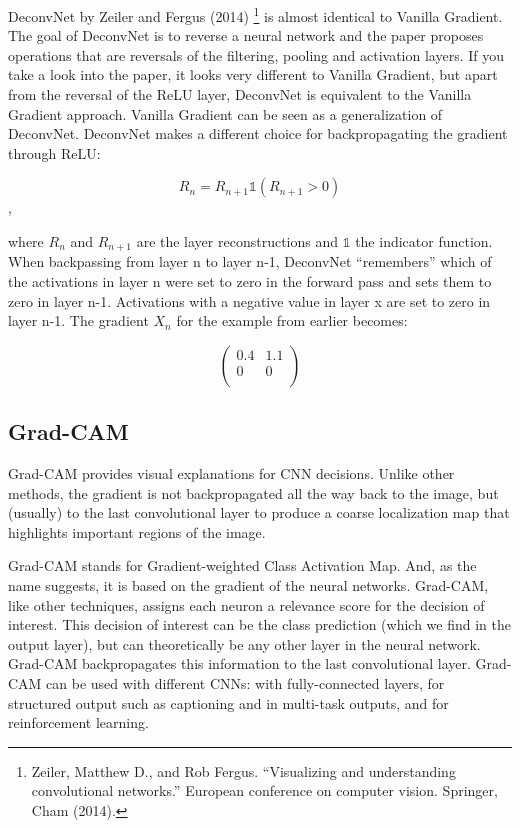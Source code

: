 \documentclass[
  10pt,
]{scrbook}
\begin{document}
DeconvNet by Zeiler and Fergus (2014) \footnote{Zeiler, Matthew D., and Rob Fergus. ``Visualizing and understanding convolutional networks.'' European conference on computer vision. Springer, Cham (2014).} is almost identical to Vanilla Gradient.
The goal of DeconvNet is to reverse a neural network and the paper proposes operations that are reversals of the filtering, pooling and activation layers.
If you take a look into the paper, it looks very different to Vanilla Gradient, but apart from the reversal of the ReLU layer, DeconvNet is equivalent to the Vanilla Gradient approach.
Vanilla Gradient can be seen as a generalization of DeconvNet.
DeconvNet makes a different choice for backpropagating the gradient through ReLU:

\[R_n=R_{n+1}\mathbb{1}(R_{n+1}>0)\],

where \(R_n\) and \(R_{n+1}\) are the layer reconstructions and \(\mathbb{1}\) the indicator function.
When backpassing from layer n to layer n-1, DeconvNet ``remembers'' which of the activations in layer n were set to zero in the forward pass and sets them to zero in layer n-1.
Activations with a negative value in layer x are set to zero in layer n-1.
The gradient \(X_n\) for the example from earlier becomes:

\[
\begin{pmatrix}
0.4 & 1.1 \\
0 & 0  \\
\end{pmatrix}
\]

\hypertarget{grad-cam}{%
\subsection{Grad-CAM}\label{grad-cam}}

Grad-CAM provides visual explanations for CNN decisions.
Unlike other methods, the gradient is not backpropagated all the way back to the image, but (usually) to the last convolutional layer to produce a coarse localization map that highlights important regions of the image.

Grad-CAM stands for Gradient-weighted Class Activation Map.
And, as the name suggests, it is based on the gradient of the neural networks.
Grad-CAM, like other techniques, assigns each neuron a relevance score for the decision of interest.
This decision of interest can be the class prediction (which we find in the output layer), but can theoretically be any other layer in the neural network.
Grad-CAM backpropagates this information to the last convolutional layer.
Grad-CAM can be used with different CNNs: with fully-connected layers, for structured output such as captioning and in multi-task outputs, and for reinforcement learning.
\end{document}
